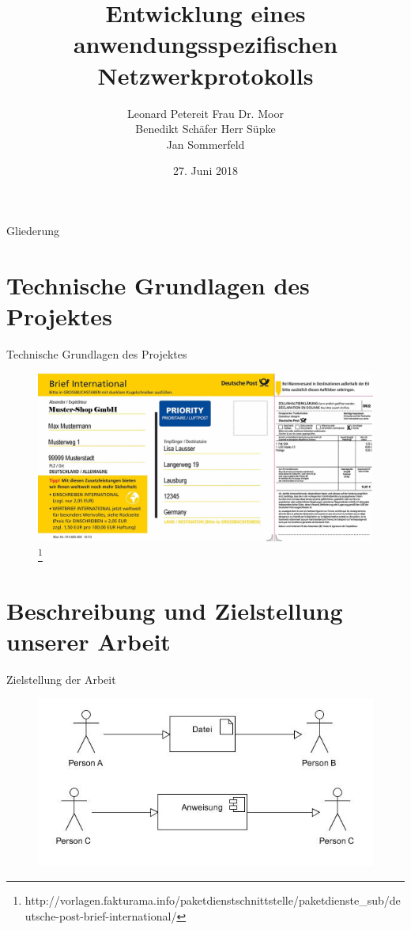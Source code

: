 \documentclass{beamer}
\title[]{Entwicklung eines anwendungsspezifischen Netzwerkprotokolls}
\author{Leonard Petereit\hfill \hspace{0.5cm} Frau Dr. Moor\\ Benedikt Schäfer\hfill \hspace{1cm} Herr Süpke \\ Jan Sommerfeld \hspace{4.25cm} }
\institute{Albert-Schweitzer Gymnasium Erfurt - Spezialschulteil}
\date{27. Juni 2018}
\begin{document}
\begin{frame}
	
  \titlepage
\end{frame}

\begin{frame}{Gliederung}

  \tableofcontents
\end{frame}



\section{Technische Grundlagen des Projektes}

\begin{frame}{Technische Grundlagen des Projektes}
\begin{figure}
\includegraphics{brief_international.jpg}
\footnote{\tiny{http://vorlagen.fakturama.info/paketdienstschnittstelle/paketdienste\_sub/deutsche-post-brief-international/}}
\end{figure}
\end{frame}

\section{Beschreibung und Zielstellung unserer Arbeit}

\begin{frame}{Zielstellung der Arbeit}
\begin{figure}
\includegraphics[width=\textwidth]{anw.jpg}
\end{figure}
\end{frame}
\end{document}
